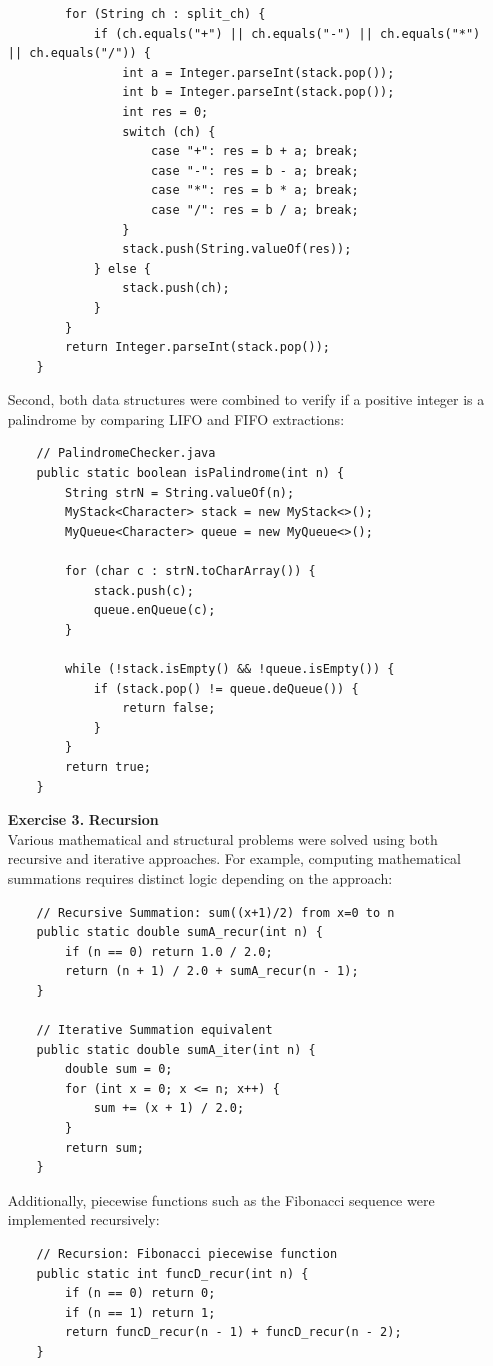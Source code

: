 \documentclass[12pt]{article}
\begin{document}
\begin{itemize}
\begin{verbatim}
        for (String ch : split_ch) {
            if (ch.equals("+") || ch.equals("-") || ch.equals("*") || ch.equals("/")) {
                int a = Integer.parseInt(stack.pop());
                int b = Integer.parseInt(stack.pop());
                int res = 0;
                switch (ch) {
                    case "+": res = b + a; break;
                    case "-": res = b - a; break;
                    case "*": res = b * a; break;
                    case "/": res = b / a; break;
                }
                stack.push(String.valueOf(res)); 
            } else {
                stack.push(ch);
            }
        }
        return Integer.parseInt(stack.pop());
    }
\end{verbatim}

Second, both data structures were combined to verify if a positive integer is a palindrome by comparing LIFO and FIFO extractions:
\begin{verbatim}
    // PalindromeChecker.java
    public static boolean isPalindrome(int n) {
        String strN = String.valueOf(n);
        MyStack<Character> stack = new MyStack<>();
        MyQueue<Character> queue = new MyQueue<>();
        
        for (char c : strN.toCharArray()) {
            stack.push(c);
            queue.enQueue(c);
        }
        
        while (!stack.isEmpty() && !queue.isEmpty()) {
            if (stack.pop() != queue.deQueue()) {
                return false; 
            }
        }
        return true; 
    }
\end{verbatim}

\item[\textbf{Exercise 3. }] \textbf{Recursion} \\
Various mathematical and structural problems were solved using both recursive and iterative approaches. For example, computing mathematical summations requires distinct logic depending on the approach:
\begin{verbatim}
    // Recursive Summation: sum((x+1)/2) from x=0 to n
    public static double sumA_recur(int n) {
        if (n == 0) return 1.0 / 2.0; 
        return (n + 1) / 2.0 + sumA_recur(n - 1);
    }

    // Iterative Summation equivalent
    public static double sumA_iter(int n) {
        double sum = 0;
        for (int x = 0; x <= n; x++) {
            sum += (x + 1) / 2.0;
        }
        return sum;
    }
\end{verbatim}
Additionally, piecewise functions such as the Fibonacci sequence were implemented recursively:
\begin{verbatim}
    // Recursion: Fibonacci piecewise function
    public static int funcD_recur(int n) {
        if (n == 0) return 0;
        if (n == 1) return 1;
        return funcD_recur(n - 1) + funcD_recur(n - 2);
    }
\end{verbatim}


\end{itemize}
\end{document}
